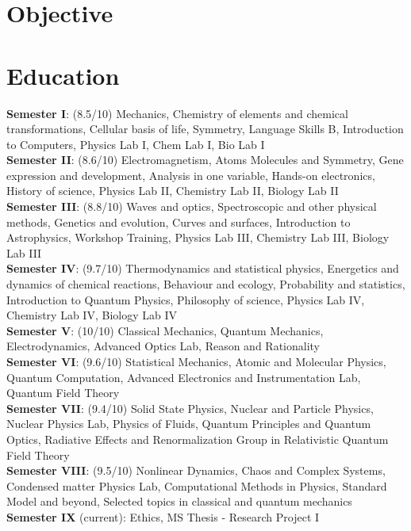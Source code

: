 \documentclass[11pt,a4paper]{moderncv}
\begin{document}
\maketitle


\section{Objective}

\section{Education}
	{
	\textbf{Semester I}: (8.5/10) Mechanics, Chemistry of elements and chemical transformations, Cellular basis of life, Symmetry, Language Skills B, Introduction to Computers, Physics Lab I, Chem Lab I, Bio Lab I\\
	\textbf{Semester II}: (8.6/10) Electromagnetism, Atoms Molecules and Symmetry, Gene expression and development, Analysis in one variable, Hands-on electronics, History of science, Physics Lab II, Chemistry Lab II, Biology Lab II\\
	\textbf{Semester III}: (8.8/10) Waves and optics, Spectroscopic and other physical methods, Genetics and evolution, Curves and surfaces, Introduction to Astrophysics, Workshop Training, Physics Lab III, Chemistry Lab III, Biology Lab III\\
	\textbf{Semester IV}: (9.7/10) Thermodynamics and statistical physics, Energetics and dynamics of chemical reactions, Behaviour and ecology, Probability and statistics, Introduction to Quantum Physics, Philosophy of science, Physics Lab IV, Chemistry Lab IV, Biology Lab IV\\
	\textbf{Semester V}: (10/10) Classical Mechanics, Quantum Mechanics, Electrodynamics, Advanced Optics Lab, Reason and Rationality\\
	\textbf{Semester VI}: (9.6/10) Statistical Mechanics, Atomic and Molecular Physics, Quantum Computation, Advanced Electronics and Instrumentation Lab, Quantum Field Theory\\
	\textbf{Semester VII}: (9.4/10) Solid State Physics, Nuclear and Particle Physics, Nuclear Physics Lab, Physics of Fluids, Quantum Principles and Quantum Optics,  Radiative Effects and Renormalization Group in Relativistic Quantum Field Theory\\
	\textbf{Semester VIII}: (9.5/10) Nonlinear Dynamics, Chaos and Complex Systems, Condensed matter Physics Lab, Computational Methods in Physics, Standard Model and beyond, Selected topics in classical and quantum mechanics \\
        \textbf{Semester IX} (current): Ethics, MS Thesis - Research Project I
	}
\end{document}
